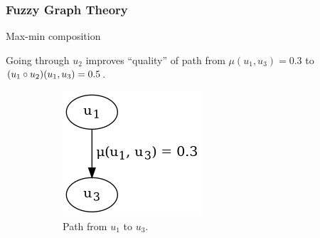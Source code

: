 \begin{frame}
	\frametitle{Fuzzy Graph Theory}

	\begin{block}{Max-min composition}

	Going through $u_2$ improves ``quality'' of path from $\mu(u_1, u_3) = 0.3$ to $(u_1 \circ u_2)(u_1, u_3) = 0.5$.

	\begin{figure}[htbp]
		\centering
		\begin{subfigure}[t]{0.25\textwidth}
			\centering
			\includegraphics[width=\linewidth,valign=t]{inc/fuzzy_graph_theory/maxmincomposition_before.png}
			\caption{Path from $u_1$ to $u_3$.}
		\end{subfigure}
		\quad
		\begin{subfigure}[t]{0.25\textwidth}
			\centering

\end{subfigure}
\end{figure}
\end{block}
\end{frame}
